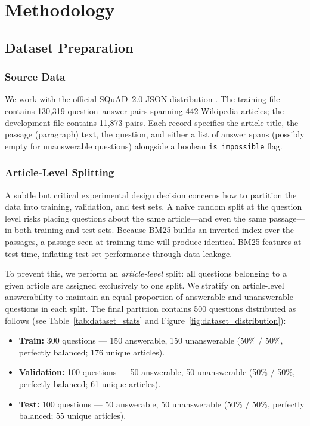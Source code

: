 \chapter{Methodology}
\label{chap:methodology}

\section{Dataset Preparation}
\label{sec:meth_dataset}

\subsection{Source Data}

We work with the official SQuAD~2.0 JSON distribution
\cite{rajpurkar2018squad2}. The training file contains 130,319 question–answer
pairs spanning 442 Wikipedia articles; the development file contains 11,873
pairs. Each record specifies the article title, the passage (paragraph) text,
the question, and either a list of answer spans (possibly empty for unanswerable
questions) alongside a boolean \texttt{is\_impossible} flag.

\subsection{Article-Level Splitting}
\label{sec:meth_split}

A subtle but critical experimental design decision concerns how to partition the
data into training, validation, and test sets. A naive random split at the
question level risks placing questions about the same article—and even the same
passage—in both training and test sets. Because BM25 builds an inverted index
over the passages, a passage seen at training time will produce identical BM25
features at test time, inflating test-set performance through data leakage.

To prevent this, we perform an \emph{article-level} split: all questions
belonging to a given article are assigned exclusively to one split. We
stratify on article-level answerability to maintain an equal proportion of
answerable and unanswerable questions in each split. The final partition
contains 500 questions distributed as follows (see
Table~\ref{tab:dataset_stats} and Figure~\ref{fig:dataset_distribution}):

\begin{itemize}
  \item \textbf{Train:} 300 questions — 150 answerable, 150 unanswerable
        (50\% / 50\%, perfectly balanced; 176 unique articles).
  \item \textbf{Validation:} 100 questions — 50 answerable, 50 unanswerable
        (50\% / 50\%, perfectly balanced; 61 unique articles).
  \item \textbf{Test:} 100 questions — 50 answerable, 50 unanswerable
        (50\% / 50\%, perfectly balanced; 55 unique articles).
\end{itemize}

